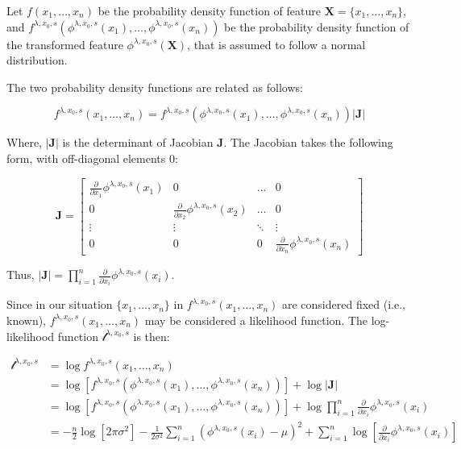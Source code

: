 \documentclass[preprint,12pt,authoryear]{elsarticle}
\begin{document}
Let \(f(x_1, \ldots, x_n)\) be the probability density function of
feature \(\mathbf{X} = \{ x_1, \ldots, x_n\}\), and
\(f^{\lambda, x_0, s} (\phi^{\lambda, x_0, s}(x_1), \ldots, \phi^{\lambda, x_0, s}(x_n))\)
be the probability density function of the transformed feature
\(\phi^{\lambda, x_0, s} (\mathbf{X})\), that is assumed to follow a
normal distribution.

The two probability density functions are related as follows:

\begin{equation}
f^{\lambda, x_0, s}(x_1, \ldots, x_n) = f^{\lambda, x_0, s} (\phi^{\lambda, x_0, s}(x_1), \ldots, \phi^{\lambda, x_0, s}(x_n)) \left|\mathbf{J}\right|
\end{equation}

Where, \(\left|\mathbf{J}\right|\) is the determinant of Jacobian
\(\mathbf{J}\). The Jacobian takes the following form, with off-diagonal
elements \(0\):

\begin{equation}
\mathbf{J} =
\begin{bmatrix}
    \frac{\partial}{\partial x_1} \phi^{\lambda, x_0, s}(x_1) & 0 & \dots & 0 \\
    0 & \frac{\partial}{\partial x_2} \phi^{\lambda, x_0, s}(x_2) & \dots & 0 \\
    \vdots & \vdots  & \ddots &  \vdots \\
    0  & 0 & 0 & \frac{\partial}{\partial x_n} \phi^{\lambda, x_0, s}(x_n)
\end{bmatrix}
\end{equation}

Thus,
\(\left| \mathbf{J} \right| = \prod_{i=1}^n \frac{\partial}{\partial x_i} \phi^{\lambda, x_0, s}(x_i)\).

Since in our situation \(\{x_1, \ldots, x_n\}\) in
\(f^{\lambda, x_0, s}(x_1, \ldots, x_n)\) are considered fixed (i.e.,
known), \(f^{\lambda, x_0, s}(x_1, \ldots, x_n)\) may be considered a
likelihood function. The log-likelihood function
\(\mathcal{l}^{\lambda, x_0, s}\) is then:

\begin{equation}
\begin{split}
\mathcal{l}^{\lambda, x_0, s} & = \log f^{\lambda, x_0, s}(x_1, \ldots, x_n) \\
 & = \log \left[ f^{\lambda, x_0, s} (\phi^{\lambda, x_0, s}(x_1), \ldots, \phi^{\lambda, x_0, s}(x_n)) \right] + \log \left|\mathbf{J}\right| \\
 & = \log \left[ f^{\lambda, x_0, s} (\phi^{\lambda, x_0, s}(x_1), \ldots, \phi^{\lambda, x_0, s}(x_n)) \right] + \log \prod_{i=1}^n \frac{\partial}{\partial x_i} \phi^{\lambda, x_0, s}(x_i) \\
 & = -\frac{n}{2} \log \left[2 \pi \sigma^2 \right] -\frac{1}{2 \sigma^2} \sum_{i=1}^n \left( \phi^{\lambda, x_0, s}(x_i) - \mu \right)^2 + \sum_{i=1}^n \log \left[ \frac{\partial}{\partial x_i} \phi^{\lambda, x_0, s}(x_i)\right]
\end{split}
\end{equation}
\end{document}

